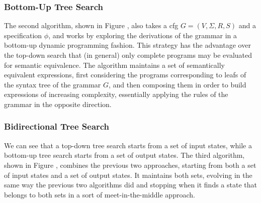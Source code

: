 \subsubsection{Bottom-Up Tree Search}
\label{sec:bottom-up-tree-search}

The second algorithm, shown in Figure , also takes a \gls{cfg} $G = (V, \Sigma{}, R, S)$ and a specification
$\phi{}$, and works by exploring the derivations of the grammar in a bottom-up
dynamic programming fashion. This strategy has the advantage over the top-down
search that (in general) only complete programs may be evaluated for semantic
equivalence. The algorithm maintains a set of semantically equivalent
expressions, first considering the programs corresponding to leafs of the syntax
tree of the grammar $G$, and then composing them in order to build expressions
of increasing complexity, essentially applying the rules of the grammar in the
opposite direction.



\subsubsection{Bidirectional Tree Search}
\label{sec:bidirectional-search}

We can see that a top-down tree search starts from a set of input states, while
a bottom-up tree search starts from a set of output states. The third algorithm,
shown in Figure , combines the
previous two approaches, starting from both a set of input states and a set of
output states. It maintains both sets, evolving in the same way the previous two
algorithms did and stopping when it finds a state that belongs to both sets in a
sort of meet-in-the-middle approach.


